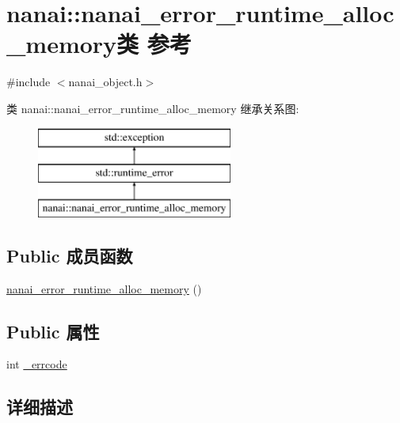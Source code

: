 \hypertarget{classnanai_1_1nanai__error__runtime__alloc__memory}{}\section{nanai\+:\+:nanai\+\_\+error\+\_\+runtime\+\_\+alloc\+\_\+memory类 参考}
\label{classnanai_1_1nanai__error__runtime__alloc__memory}


{\ttfamily \#include $<$nanai\+\_\+object.\+h$>$}

类 nanai\+:\+:nanai\+\_\+error\+\_\+runtime\+\_\+alloc\+\_\+memory 继承关系图\+:\begin{figure}[H]
\begin{center}
\leavevmode
\includegraphics[height=3.000000cm]{classnanai_1_1nanai__error__runtime__alloc__memory}
\end{center}
\end{figure}
\subsection*{Public 成员函数}
\begin{DoxyCompactItemize}
\item 
\hyperlink{classnanai_1_1nanai__error__runtime__alloc__memory_aa638631a5e632fc47409027525c58401}{nanai\+\_\+error\+\_\+runtime\+\_\+alloc\+\_\+memory} ()
\end{DoxyCompactItemize}
\subsection*{Public 属性}
\begin{DoxyCompactItemize}
\item 
int \hyperlink{classnanai_1_1nanai__error__runtime__alloc__memory_a3212283dfac6316bc3ac8e3c2f7578df}{\+\_\+errcode}
\end{DoxyCompactItemize}


\subsection{详细描述}


